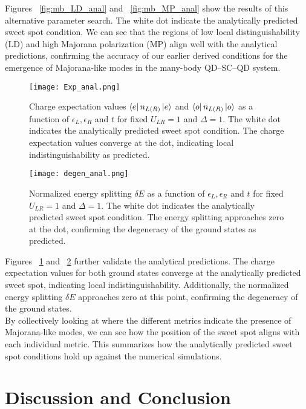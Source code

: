 \documentclass[11pt, letterpaper, titlepage]{article}
\begin{document}
Figures ~\ref{fig:mb_LD_anal} and ~\ref{fig:mb_MP_anal} show the results of this alternative parameter search. The white dot indicate the analytically predicted sweet spot condition. We can see that the regions of low local distinguishability (LD) and high Majorana polarization (MP) align well with the analytical predictions, confirming the accuracy of our earlier derived conditions for the emergence of Majorana-like modes in the many-body QD–SC–QD system.
\newpage  
\begin{figure}
  \centering
  \texttt{[image: Exp\_anal.png]}
  \caption{Charge expectation values $\bra{e}n_{L(R)}\ket{e}$ and $\bra{o}n_{L(R)}\ket{o}$ as a function of $ϵ_L,ϵ_R$ and $t$ for fixed $U_{LR} = 1$ and $Δ = 1$. The white dot indicates the analytically predicted sweet spot condition. The charge expectation values converge at the dot, indicating local indistinguishability as predicted.}
  \label{fig:mb_charge_anal}
\end{figure}
\begin{figure}
  \centering
  \texttt{[image: degen\_anal.png]}
  \caption{Normalized energy splitting $\delta E$ as a function of $ϵ_L,ϵ_R$ and $t$ for fixed $U_{LR} = 1$ and $Δ = 1$. The white dot indicates the analytically predicted sweet spot condition. The energy splitting approaches zero at the dot, confirming the degeneracy of the ground states as predicted.}
  \label{fig:mb_deltaE_anal}
\end{figure}
Figures ~\ref{fig:mb_charge_anal} and ~\ref{fig:mb_deltaE_anal} further validate the analytical predictions. The charge expectation values for both ground states converge at the analytically predicted sweet spot, indicating local indistinguishability. Additionally, the normalized energy splitting $\delta E$ approaches zero at this point, confirming the degeneracy of the ground states.\\
By collectively looking at where the different metrics indicate the presence of Majorana-like modes, we can see how the position of the sweet spot aligns with each individual metric. This summarizes how the analytically predicted sweet spot conditions hold up against the numerical simulations.
\newpage
\section{Discussion and Conclusion}
\end{document}
